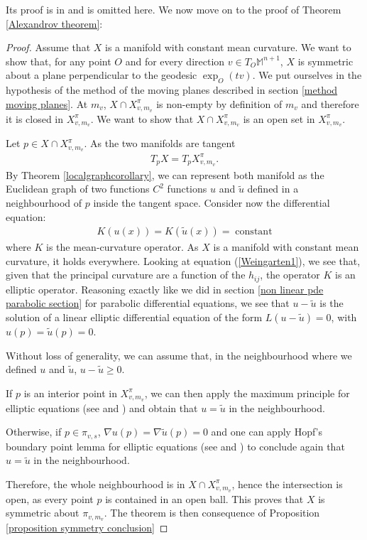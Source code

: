 Its proof is in \cite{italiani} and is omitted here. We now move on to the proof of Theorem \ref{Alexandrov theorem}:
\begin{proof}
	Assume that $X$ is a manifold with constant mean curvature. 
	We want to show that, for any point $O$ and for every direction $v\in T_O\mathbb{M}^{n+1}$, $X$ is symmetric about a plane perpendicular to the geodesic $\exp_O(tv)$. We put ourselves in the hypothesis of the method of the moving planes described in section \ref{method moving planes}. At $m_v$, $X \cap X_{v, m_v}^\pi$ is non-empty by definition of $m_v$ and therefore it is closed in $X_{v, m_v}^\pi$. We want to show that  $X \cap X_{v, m_v}^\pi$ is an open set in $X_{v, m_v}^\pi$. 
	
	Let $p\in X\cap X_{v, m_v}^\pi$. As the two manifolds are tangent
	\begin{align*}
		T_p X=T_p X_{v, m_v}^\pi.
	\end{align*} By Theorem \ref{localgraphcorollary}, we can represent both manifold as the Euclidean graph of two functions $C^2$ functions $u$ and $\tilde{u}$ defined in a neighbourhood of $p$ inside the tangent space. Consider now the differential equation: 
	\begin{align*}
		K(u(x))=K(\tilde{u}(x))=\;\mathrm{constant} 
	\end{align*}
	where $K$ is the mean-curvature operator. As $X$ is a manifold with constant mean curvature, it holds everywhere. 
	Looking at equation (\ref{Weingarten1}), we see that, given that the principal curvature are a function of the $h_{ij}$, the operator $K$ is an elliptic operator. Reasoning exactly like we did in section \ref{non linear pde parabolic section} for parabolic differential equations, we see that $u-\tilde{u}$ is the solution of a linear elliptic differential equation of the form $L (u-\tilde{u})=0$, with $u(p)=\tilde{u}(p)=0$. 
	
	Without loss of generality, we can assume that, in the neighbourhood where we defined $u$ and $\tilde{u}$, $u-\tilde{u}\geq 0$. 
	
	If $p$ is an interior point in $X_{v, m_v}^\pi$, we can then apply the maximum principle for elliptic equations  (see \cite{Evans} and \cite{protterweinberger}) and obtain that  $u=\tilde{u}$ in the neighbourhood. 
	
	Otherwise, if $p\in\pi_{v,s}$, $\nabla u (p)=\nabla \tilde{u} (p)=0$ and one can apply Hopf's boundary point lemma for elliptic equations (see \cite{Evans} and \cite{protterweinberger}) to conclude again that $u=\tilde{u}$ in the neighbourhood.
	
	Therefore, the whole neighbourhood is in $X\cap X_{v, m_v}^\pi$, hence the intersection is open, as every point $p$ is contained in an open ball. This proves that $X$ is symmetric about $\pi_{v, m_v}$. The theorem is then consequence of Proposition \ref{proposition symmetry conclusion}
\end{proof}

